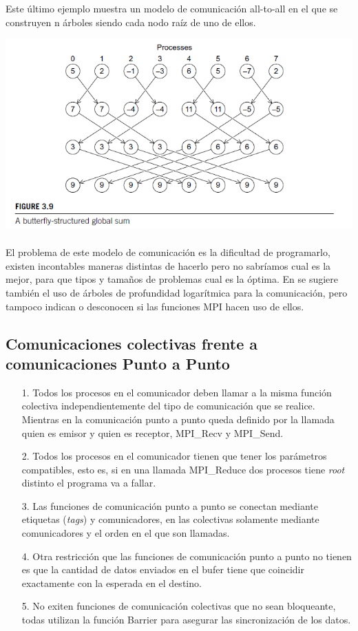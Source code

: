 \documentclass[es,gi]{ifirak}
\newenvironment{Figure}
  {\par\medskip\noindent\minipage{\columnwidth}}
  {\endminipage\par\medskip}
\begin{document}
\begin{multicols}{2}
Este último ejemplo muestra un modelo de comunicación all-to-all en el que se construyen n árboles siendo cada nodo raíz de uno de ellos. 
\begin{Figure}
	\centering
		\includegraphics[width=1\columnwidth]{Butterfly.png}
\end{Figure}

\paragraph{}
El problema de este modelo de comunicación es la dificultad de programarlo, existen incontables maneras distintas de hacerlo pero no sabríamos cual es la mejor, para que tipos y tamaños de problemas cual es la óptima. En \cite{key-2} se sugiere también el uso de árboles de profundidad logarítmica para la comunicación, pero tampoco indican o desconocen si las funciones MPI hacen uso de ellos.
\subsection{Comunicaciones colectivas frente a comunicaciones Punto a Punto}

\begin{itemize}
\item[1.] Todos los procesos en el comunicador deben llamar a la misma función colectiva independientemente del tipo de comunicación que se realice. Mientras en la comunicación punto a punto queda definido por la llamada quien es emisor y quien es receptor, MPI\_Recv y MPI\_Send.
\item[2.] Todos los procesos en el comunicador tienen que tener los parámetros compatibles, esto es, si en una llamada MPI\_Reduce dos procesos tiene \textit{root} distinto el programa va a fallar.
\item[3.] Las funciones de comunicación punto a punto se conectan mediante etiquetas (\textit{tags}) y comunicadores, en las colectivas solamente mediante comunicadores y el orden en el que son llamadas.
\item[4.] Otra restricción que las funciones de comunicación punto a punto no tienen es que la cantidad de datos enviados en el bufer tiene que coincidir exactamente con la esperada en el destino.
\item[5.] No exiten funciones de comunicación colectivas que no sean bloqueante, todas utilizan la función Barrier para asegurar las sincronización de los datos.


\end{itemize}
\end{multicols}
\end{document}
